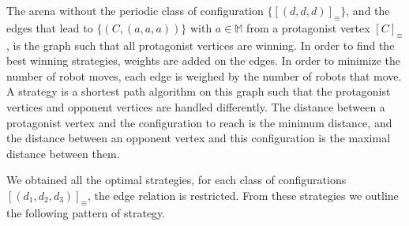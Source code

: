 \documentclass[envcountsame]{llncs} \usepackage[english]{babel}
\newcommand{\equivclass}[1]{[#1]_\equiv}
\newcommand{\Act}{\ensuremath{\mathbb{M}}}
\begin{document}
The arena without the periodic class of configuration $\{\equivclass{(d, d, d)}\}$, and the edges that lead to 
$\{(C,(a,a,a))\}$ with $a \in \Act$ from a protagonist vertex $\equivclass{C}$, is the graph such that all protagonist vertices are winning. 
In order to find the best winning strategies, weights are added on the edges. 
In order to minimize the number of robot moves, each edge is weighed by the number of robots that move.
A strategy is  a shortest path algorithm on this graph such that the protagonist vertices and opponent vertices
are handled differently.
The distance between a protagonist vertex and the configuration to reach is the minimum distance, and the distance between 
an opponent vertex and this configuration is the maximal distance between them.

We obtained all the optimal strategies, for each class of configurations 
$\equivclass{(d_1, d_2, d_3)}$, the edge relation is restricted.
From these strategies we outline the following pattern of strategy.
\end{document}
